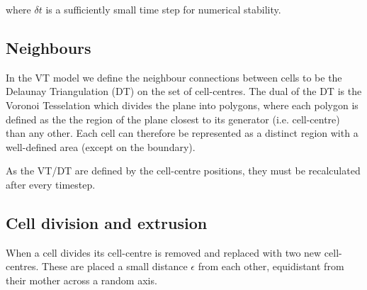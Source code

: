 \documentclass[a4paper]{article}
\begin{document}
where $\delta t$ is a sufficiently small time step for numerical stability.
\subsection{Neighbours}
In the VT model we define the neighbour connections between cells to be the Delaunay Triangulation (DT) on the set of cell-centres. The dual of the DT is the Voronoi Tesselation which divides the plane into polygons, where each polygon is defined as the the region of the plane closest to its generator (i.e. cell-centre) than any other. Each cell can therefore be represented as a distinct region with a well-defined area (except on the boundary). 

As the VT/DT are defined by the cell-centre positions, they must be recalculated after every timestep.


\subsection{Cell division and extrusion}
When a cell divides its cell-centre is removed and replaced with two new cell-centres. These are placed a small distance $\epsilon$ from each other, equidistant from their mother across a random axis. 
\end{document}
